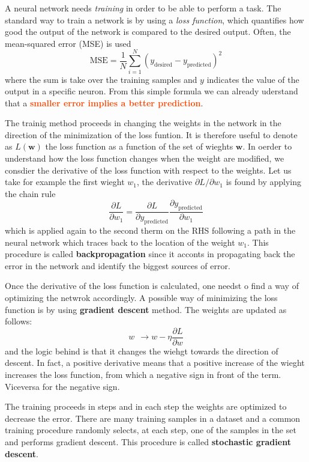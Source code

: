 \documentclass[11pt]{article}
\newcommand{\important}[1]{\textcolor{OrangeRed}{\bf{#1}}}
\begin{document}
A neural network needs \textit{training} in order to be able to perform a task. The standard way to train a network is by using a \textit{loss function}, which quantifies how good the output of the network is compared to the desired output. Often, the mean-squared error (MSE) is used
\[
\text{MSE} = \frac{1}{N} \sum_{i=1}^{N} (y_{\text{desired}} - y_{\text{predicted}})^2    
\]
where the sum is take over the training samples and $y$ indicates the value of the output in a specific neuron. From this simple formula we can already uderstand that a \important{smaller error implies a better prediction}. 

The trainig method proceeds in changing the weights in the network in the direction of the minimization of the loss funtion. It is therefore useful to denote as $L(\mathbf{w})$ the loss function as a function of the set of wieghts $\mathbf{w}$. In oerder to understand how the loss function changes when the weight are modified, we consdier the derivative of the loss function with respect to the weights. Let us take for example the first wieght $w_1$, the derivative $\partial L/\partial w_1$ is found by applying the chain rule
\[
\frac{\partial L}{\partial w_1} = \frac{\partial L}{\partial y_{\text{predicted}}} \frac{\partial y_{\text{predicted}}}{\partial w_1}    
\]
which is applied again to the second therm on the RHS following a path in the neural network which traces back to the location of the weight $w_1$. This procedure is called \textbf{backpropagation} since it acconts in propagating back the error in the network and identify the biggest sources of error. 

Once the derivative of the loss function is calculated, one needst o find a way of optimizing the netwrok accordingly. A possible way of minimizing the loss function is by using \textbf{gradient descent} method. The weights are updated as follows:
\[
w \ \ \rightarrow w - \eta \frac{\partial L}{\partial w}    
\]
and the logic behind is that it changes the wiehgt towards the direction of descent. In fact, a positive derivative means that a positive increase of the wieght increases the loss function, from which a negative sign in front of the term. Viceversa for the negative sign. 

The training proceeds in steps and in each step the weights are optimized to decrease the error. There are many training samples in a dataset and a common training procedure randomly selects, at each step, one of the samples in the set and performs gradient descent. This procedure is called \textbf{stochastic gradient descent}.
\end{document}
